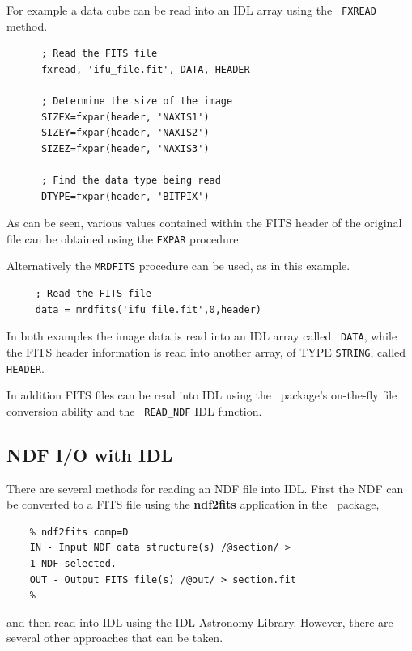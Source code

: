 \documentclass[twoside,11pt]{article}
\newcommand{\htmladdnormallink}[2]{#1}
\newcommand{\xref}[3]{#1}
\newcommand{\xlabel}[1]{}
\begin{document}
\begin{\htmlonly}
For example a data cube can be read into an IDL array using the {\tt
FXREAD} method.

\small\begin{verbatim}
      ; Read the FITS file
      fxread, 'ifu_file.fit', DATA, HEADER
 
      ; Determine the size of the image
      SIZEX=fxpar(header, 'NAXIS1')
      SIZEY=fxpar(header, 'NAXIS2')
      SIZEZ=fxpar(header, 'NAXIS3')
 
      ; Find the data type being read
      DTYPE=fxpar(header, 'BITPIX')
\end{verbatim}\normalsize

As can be seen, various values contained within the FITS header of the
original file can be obtained using the {\tt FXPAR} procedure.

Alternatively the {\tt MRDFITS} procedure can be used, as in this
example.

\small\begin{verbatim}
     ; Read the FITS file
     data = mrdfits('ifu_file.fit',0,header)
\end{verbatim}\normalsize

In both examples the image data is read into an IDL array called {\tt
DATA}, while the FITS header information is read into another array,
of TYPE {\tt STRING}, called {\tt HEADER}.

In addition FITS files can be read into IDL using the
\CONVERTref\normalsize\ package's \xref{on-the-fly file conversion}{sun55}{sect_auto}
ability and the \xref{{\tt
READ\_NDF}}{sun55}{READ_NDF} IDL function.
 
\subsection{\xlabel{sc16_ndfidl}NDF I/O with IDL\label{sc16_ndfidl}}

There are several methods for reading an \xref{NDF}{sun33}{} file into
IDL.  First the NDF can be converted to a FITS file using the
\xref{{\bf ndf2fits}}{sun55}{NDF2FITS} application in the \CONVERTref\
package,

\small\begin{verbatim}
    % ndf2fits comp=D
    IN - Input NDF data structure(s) /@section/ > 
    1 NDF selected.
    OUT - Output FITS file(s) /@out/ > section.fit
    %
\end{verbatim}\normalsize

and then read into IDL using the \htmladdnormallink{IDL Astronomy
Library}{http://idlastro.gsfc.nasa.gov/homepage.html}\latexonly{ (as
in Section~\ref{sc16_fitsidl})}.  However, there are several other
approaches that can be taken.


\end{\htmlonly}
\end{document}
